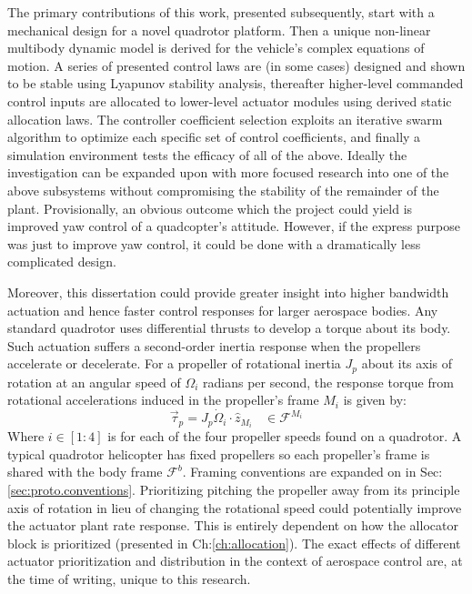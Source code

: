 \par
The primary contributions of this work, presented subsequently, start with a mechanical design for a novel quadrotor platform. Then a unique non-linear multibody dynamic model is derived for the vehicle's complex equations of motion. A series of presented control laws are (in some cases) designed and shown to be stable using Lyapunov stability analysis, thereafter higher-level commanded control inputs are allocated to lower-level actuator modules using derived static allocation laws. The controller coefficient selection exploits an iterative swarm algorithm to optimize each specific set of control coefficients, and finally a simulation environment tests the efficacy of all of the above. Ideally the investigation can be expanded upon with more focused research into one of the above subsystems without compromising the stability of the remainder of the plant. Provisionally, an obvious outcome which the project could yield is improved yaw control of a quadcopter's attitude. However, if the express purpose was just to improve yaw control, it could be done with a dramatically less complicated design.
\par
Moreover, this dissertation could provide greater insight into higher bandwidth actuation and hence faster control responses for larger aerospace bodies. Any standard quadrotor uses differential thrusts to develop a torque about its body. Such actuation suffers a second-order inertia response when the propellers accelerate or decelerate. For a propeller of rotational inertia $J_p$ about its axis of rotation at an angular speed of $\Omega_i$ radians per second, the response torque from rotational accelerations induced in the propeller's frame $M_i$ is given by:
\begin{equation}
\vec{\tau}_{p}=J_p\dot{\Omega}_i\cdot\hat{z}_{M_i}~~~~\in\mathcal{F}^{M_i}
\end{equation}
Where $i\in[1:4]$ is for each of the four propeller speeds found on a quadrotor. A typical quadrotor helicopter has fixed propellers so each propeller's frame is shared with the body frame $\mathcal{F}^{b}$. Framing conventions are expanded on in Sec:\ref{sec:proto.conventions}. Prioritizing pitching the propeller away from its principle axis of rotation in lieu of changing the rotational speed could potentially improve the actuator plant rate response. This is entirely dependent on how the allocator block is prioritized (presented in Ch:\ref{ch:allocation}). The exact effects of different actuator prioritization and distribution in the context of aerospace control are, at the time of writing, unique to this research.
\newpage
